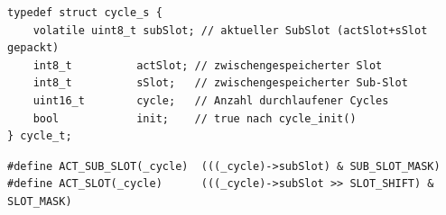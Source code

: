 \begin{listing}
\begin{verbatim}
typedef struct cycle_s {
    volatile uint8_t subSlot; // aktueller SubSlot (actSlot+sSlot gepackt)
    int8_t          actSlot; // zwischengespeicherter Slot
    int8_t          sSlot;   // zwischengespeicherter Sub-Slot
    uint16_t        cycle;   // Anzahl durchlaufener Cycles
    bool            init;    // true nach cycle_init()
} cycle_t;
\end{verbatim}
\caption{Definition der \texttt{cycle\_t} Struktur}
\label{cycle_t}
\end{listing}

\begin{listing}
\begin{verbatim}
#define ACT_SUB_SLOT(_cycle)  (((_cycle)->subSlot) & SUB_SLOT_MASK)
#define ACT_SLOT(_cycle)      (((_cycle)->subSlot >> SLOT_SHIFT) & SLOT_MASK)
\end{verbatim}
\caption{Makros zum Extrahieren von Slot und Sub-Slot}
\label{cycle_macros}
\end{listing}


